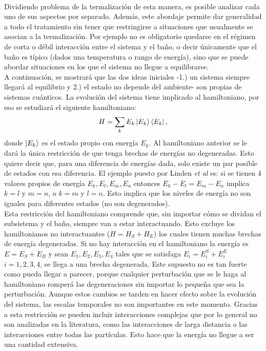 \\
Dividiendo problema de la termalización de esta manera, es posible analizar cada uno de sus aspectos por separado. Además, este abordaje permite dar generalidad a todo el tratamiento sin tener que restringirse a situaciones que usualmente se asocian a la termalización. Por ejemplo no es obligatorio quedarse en el régimen de corta o débil interacción entre el sistema y el baño, o decir únicamente que el baño es típico (dados una temperatura o rango de energía), sino que se puede abordar situaciones en los que el sistema no llegue a equilibrarse. 
\\
A continuación, se mostrará que las dos ideas iniciales -1.) un sistema siempre llegará al equilibrio y 2.) el estado no depende del ambiente- son propias de sistemas cuánticos. La evolución del sistema tiene implicado al hamiltoniano, por eso se estudiará el siguiente hamiltoniano:
\begin{equation}
H= \sum_{k} E_{k} \ket{E_{k}} \bra{E_{k}},
\end{equation}
donde $\ket{E_{k}}$ es el estado propio con energía $E_{k}$. Al hamiltoniano anterior se le dará la única restricción de que tenga brechas de energías no degeneradas. Esto quiere decir que, para una diferencia de energías dada, solo existe un par posible de estados con esa diferencia. El ejemplo puesto por Linden \textit{et al} \cite{LindenPaper} es: si se tienen 4 valores propios de energía $E_{k}, E_{l},E_{m},E_{n}$ entonces $E_{k}-E_{l}=E_{m}-E_{n} $ implica $k=l$ y $m=n$, o $k=m$ y $l=n$. Esto implica que los niveles de energía no son iguales para diferentes estados (no son degenerados).\\
Esta restricción del hamiltoniano comprende que, sin importar cómo se dividan el subsistema y el baño, siempre van a estar interactuando. Esto excluye los hamiltonianos no interactuantes ($H=H_{S}+H_{E}$) los cuales tienen muchas brechas de energía degeneradas. Si no hay interacción en el hamiltoniano la energía es $E=E_{S}+E_{B}$ y sean $E_{1},E_{2},E_{3},E_{4}$ tales que se satisfaga $E_{i}=E_{i}^{S}+E_{i}^{E}$ $i=1,2,3,4$, se llega a una brecha degenerada. Este supuesto no es tan fuerte como pueda llegar a parecer, porque cualquier perturbación que se le haga al hamiltoniano romperá las degeneraciones sin importar lo pequeña que sea la perturbación. Aunque estos cambios se tarden en hacer efecto sobre la evolución del sistema, las escalas temporales no son importantes en este momento.  Gracias a esta restricción se pueden incluir interacciones complejas que por lo general no son analizadas en la literatura, como las interacciones de larga distancia o las interacciones entre todas las partículas. Esto hace que la energía no llegue a ser una cantidad extensiva.

